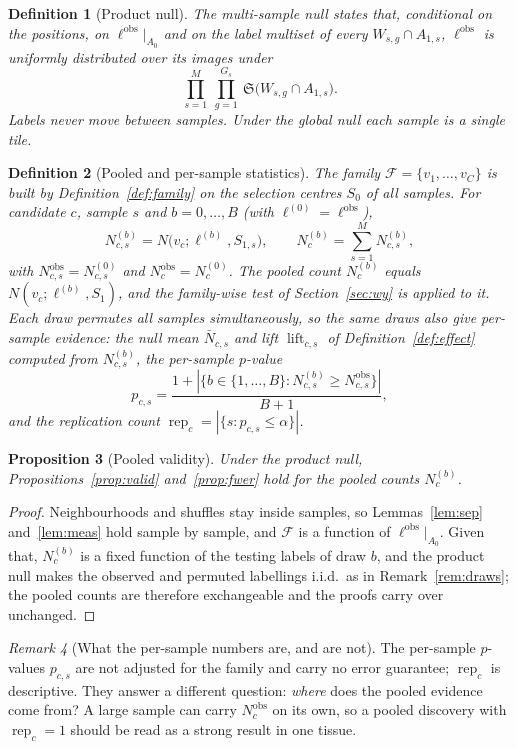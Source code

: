 \documentclass[11pt,a4paper]{article}
\newtheorem{definition}{Definition}[section]
\newtheorem{proposition}[definition]{Proposition}
\theoremstyle{remark}
\newtheorem{remark}[definition]{Remark}
\newcommand{\lab}{\ell}
\newcommand{\obs}{\mathrm{obs}}
\newcommand{\Sym}{\mathfrak{S}}
\newcommand{\lift}{\operatorname{lift}}
\newcommand{\rep}{\operatorname{rep}}
\begin{document}
\begin{definition}[Product null]
\label{def:product}
The multi-sample null states that, conditional on the positions, on
$\lab^{\obs}|_{A_0}$ and on the label multiset of every $W_{s,g}\cap A_{1,s}$,
$\lab^{\obs}$ is uniformly distributed over its images under
\[
  \prod_{s=1}^{M}\ \prod_{g=1}^{G_s}\ \Sym\bigl(W_{s,g}\cap A_{1,s}\bigr).
\]
Labels never move between samples. Under the global null each sample is a
single tile.
\end{definition}

\begin{definition}[Pooled and per-sample statistics]
\label{def:pooled}
The family $\mathcal F=\{v_1,\dots,v_C\}$ is built by
Definition~\ref{def:family} on the selection centres $S_0$ of all samples.
For candidate $c$, sample $s$ and $b=0,\dots,B$ (with $\lab^{(0)}=\lab^{\obs}$),
\[
  N^{(b)}_{c,s}=N\bigl(v_c;\lab^{(b)},S_{1,s}\bigr),\qquad
  N^{(b)}_c=\sum_{s=1}^{M}N^{(b)}_{c,s},
\]
with $N^{\obs}_{c,s}=N^{(0)}_{c,s}$ and $N^{\obs}_c=N^{(0)}_c$. The pooled
count $N^{(b)}_c$ equals $N(v_c;\lab^{(b)},S_1)$, and the family-wise test of
Section~\ref{sec:wy} is applied to it. Each draw permutes all samples
simultaneously, so the same draws also give per-sample evidence: the null
mean $\bar N_{c,s}$ and lift $\lift_{c,s}$ of Definition~\ref{def:effect}
computed from $N^{(b)}_{c,s}$, the per-sample $p$-value
\[
  p_{c,s}=\frac{1+|\{b\in\{1,\dots,B\}:N^{(b)}_{c,s}\ge N^{\obs}_{c,s}\}|}{B+1},
\]
and the replication count $\rep_c=|\{s:p_{c,s}\le\alpha\}|$.
\end{definition}

\begin{proposition}[Pooled validity]
\label{prop:multi}
Under the product null, Propositions~\ref{prop:valid} and~\ref{prop:fwer} hold
for the pooled counts $N_c^{(b)}$.
\end{proposition}

\begin{proof}
Neighbourhoods and shuffles stay inside samples, so Lemmas~\ref{lem:sep}
and~\ref{lem:meas} hold sample by sample, and $\mathcal F$ is a function of
$\lab^{\obs}|_{A_0}$. Given that, $N^{(b)}_c$ is a fixed function of the
testing labels of draw $b$, and the product null makes the observed and
permuted labellings i.i.d.\ as in Remark~\ref{rem:draws}; the pooled counts
are therefore exchangeable and the proofs carry over unchanged.
\end{proof}

\begin{remark}[What the per-sample numbers are, and are not]
The per-sample $p$-values $p_{c,s}$ are not adjusted for the family and carry
no error guarantee; $\rep_c$ is descriptive. They answer a different
question: \emph{where} does the pooled evidence come from? A large sample can
carry $N^{\obs}_c$ on its own, so a pooled discovery with $\rep_c=1$ should be
read as a strong result in one tissue.
\end{remark}
\end{document}
